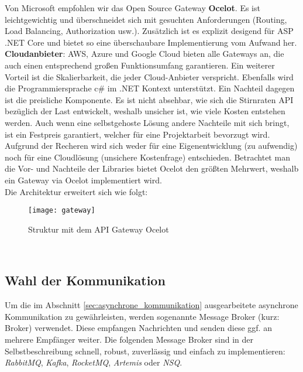 {Von Microsoft empfohlen wir das Open Source Gateway \textbf{Ocelot}. Es ist leichtgewichtig und überschneidet sich mit gesuchten Anforderungen (Routing, Load Balancing, Authorization usw.). Zusätzlich ist es explizit desigend für ASP .NET Core und bietet so eine überschaubare Implementierung vom Aufwand her.\cite{microsoftOcelot}\\

\textbf{Cloudanbieter}: AWS, Azure und Google Cloud bieten alle Gateways an, die auch einen entsprechend großen Funktionsumfang garantieren. Ein weiterer Vorteil ist die Skalierbarkeit, die jeder Cloud-Anbieter verspricht. Ebenfalls wird die Programmiersprache c\# im .NET Kontext unterstützt.\cite{GoogleCloudEndpointsDotNet}\cite{AWSDotNet} Ein Nachteil dagegen ist die preisliche Komponente. Es ist nicht absehbar, wie sich die Stirnraten API bezüglich der Last entwickelt, weshalb unsicher ist, wie viele Kosten entstehen werden. Auch wenn eine selbstgehoste Lösung andere Nachteile mit sich bringt, ist ein Festpreis garantiert, welcher für eine Projektarbeit bevorzugt wird. \\

Aufgrund der Recheren wird sich weder für eine Eigenentwicklung (zu aufwendig) noch für eine Cloudlösung (unsichere Kostenfrage) entschieden. Betrachtet man die Vor- und Nachteile der Libraries bietet Ocelot den größten Mehrwert, weshalb ein Gateway via Ocelot implementiert wird.\\

Die Architektur erweitert sich wie folgt: 
\begin{figure}[ht]
	\centering
	\texttt{[image: gateway]}
	\caption[API Gateway mit Ocelot] {Struktur mit dem API Gateway Ocelot}
	\label{fig:gateway}
\end{figure}
\\

\subsection{Wahl der Kommunikation}

Um die im Abschnitt \ref{sec:asynchrone_kommunikation}  ausgearbeitete asynchrone Kommunikation zu gewährleisten, werden sogenannte Message Broker (kurz: Broker) verwendet. Diese empfangen Nachrichten und senden diese ggf. an mehrere Empfänger weiter. Die folgenden Message Broker sind in der Selbstbeschreibung schnell, robust, zuverlässig und einfach zu implementieren: \textit{RabbitMQ}, \textit{Kafka}, \textit{RocketMQ}, \textit{Artemis} oder \textit{NSQ}.\\

}
